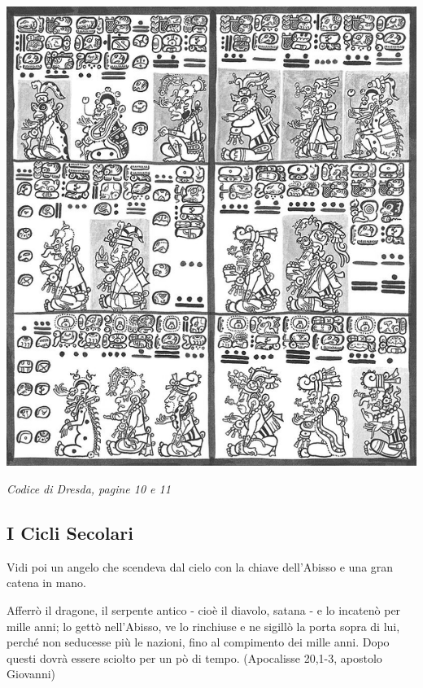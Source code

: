 \vfill

\begin{center}
\includegraphics[width=0.5\linewidth]{immagini/Laminas_8_y_9_del_Codice_de_Dresden2.png}

\medskip

\emph{Codice di Dresda, pagine 10 e 11}
\end{center}

\pagebreak

\subsection{I Cicli Secolari}

\begin{changemargin}{0.3cm}{0.3cm}\begin{enfasi}{
Vidi poi un angelo che scendeva dal cielo con la chiave dell'Abisso e una gran catena in mano.

Afferrò il dragone, il serpente antico - cioè il diavolo, satana - e lo incatenò per mille anni; lo gettò nell'Abisso, ve lo rinchiuse e ne sigillò la porta sopra di lui, perché non seducesse più le nazioni, fino al compimento dei mille anni. Dopo questi dovrà essere sciolto per un pò di tempo. (Apocalisse 20,1-3, apostolo Giovanni)
}\end{enfasi}\end{changemargin}\medskip

